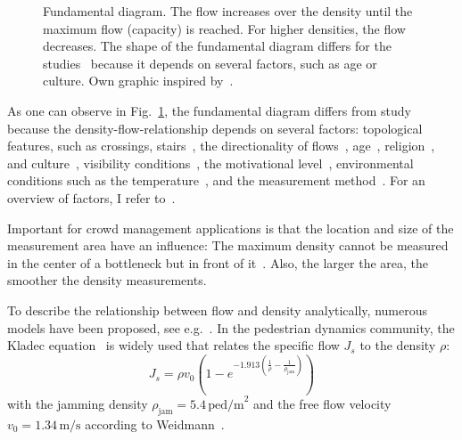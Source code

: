 \begin{figure}[hbt!]
\caption{Fundamental diagram. The flow increases over the density until the maximum flow (capacity) is reached. For higher densities, the flow decreases. The shape of the fundamental diagram differs for the studies~\cite{hurley-2016-cdyn,weidmann-1994-cdyn,predtechenskii-1968-cdyn,older-1968-cdyn,helbing-2007-cdyn} because it depends on several factors, such as age or culture. Own graphic inspired by~\cite{zhang-2012e-cdyn,kitzlinger-2020-cdyn}.}
\label{fig:fundamental}
\end{figure}


As one can observe in Fig.~\ref{fig:fundamental}, the fundamental diagram differs from study because the density-flow-relationship depends on several factors: topological features, such as crossings, stairs~\cite{burghardt-2013-cdyn}, the directionality of flows~\cite{feliciani-2016b-cdyn}, age~\cite{cao-2016-cdyn,ren-2019-cdyn}, religion~\cite{subramanian-2021-cdyn}, and culture~\cite{chattaraj-2009-cdyn}, visibility conditions~\cite{cao-2018-cdyn}, the motivational level~\cite{ye-2012-cdyn}, environmental conditions such as the temperature~\cite{kim-2018-cdyn}, and the measurement method~\cite{zhang-2012e-cdyn}. For an overview of factors, I refer to~\cite{paetzke-2023-cdyn}.

Important for crowd management applications is that the location and size of the measurement area have an influence:  The maximum density cannot be measured in the center of a bottleneck but in front of it~\cite{zhang-2012e-cdyn}. Also, the larger the area, the smoother the density measurements.



To describe the relationship between flow and density analytically, numerous models have been proposed, see e.g.~\cite{hurley-2016-cdyn,mori-1987-cdyn,bosina-2018-cdyn,fruin-1971-cdyn,lam-1995-cdyn,navin-1969-cdyn}. In the pedestrian dynamics community, the Kladec equation~\cite{weidmann-1992-cdyn} is widely used that relates the specific flow $J_s$ to the density $\rho$:
\begin{equation}
J_s = \rho v_0  \left( 1  - e^{-1.913 \left(  \frac{1}{\rho} - \frac{1}{\rho_{\text{jam}}} \right) }  \right)
\label{eq:kladec}
\end{equation}
with the jamming density $\rho_\text{jam}=5.4\,\text{ped/m}^2$ and the free flow velocity $v_0=1.34\,\text{m/s}$ according to Weidmann~\cite{weidmann-1992-cdyn}.


